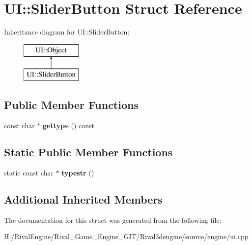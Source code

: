 \hypertarget{struct_u_i_1_1_slider_button}{}\section{UI\+:\+:Slider\+Button Struct Reference}
\label{struct_u_i_1_1_slider_button}
Inheritance diagram for UI\+:\+:Slider\+Button\+:\begin{figure}[H]
\begin{center}
\leavevmode
\includegraphics[height=2.000000cm]{struct_u_i_1_1_slider_button}
\end{center}
\end{figure}
\subsection*{Public Member Functions}
\begin{DoxyCompactItemize}
\item 
\mbox{\label{struct_u_i_1_1_slider_button_ac2ca4fb1b6979f79b08a8dcca0720557}} 
const char $\ast$ {\bfseries gettype} () const
\end{DoxyCompactItemize}
\subsection*{Static Public Member Functions}
\begin{DoxyCompactItemize}
\item 
\mbox{\label{struct_u_i_1_1_slider_button_afdc7d3d340d2a62ea4b35847d5c9f50a}} 
static const char $\ast$ {\bfseries typestr} ()
\end{DoxyCompactItemize}
\subsection*{Additional Inherited Members}


The documentation for this struct was generated from the following file\+:\begin{DoxyCompactItemize}
\item 
H\+:/\+Rival\+Engine/\+Rival\+\_\+\+Game\+\_\+\+Engine\+\_\+\+G\+I\+T/\+Rival3dengine/source/engine/ui.\+cpp\end{DoxyCompactItemize}
